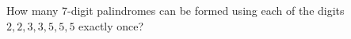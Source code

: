 How many $7$-digit palindromes can be formed using each of the digits $2,2,3,3,5,5,5$ exactly once?

